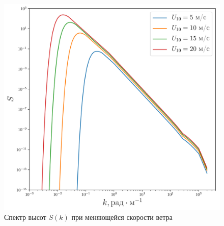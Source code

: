 \begin{figure}[ht]
        \centering
        \includegraphics[width=0.6\linewidth]{fig/full_spectrum1.png}
        \caption{Спектр высот $S(k)$ при меняющейся скорости ветра}
        \label{fig:spectrum_heights}
\end{figure}
